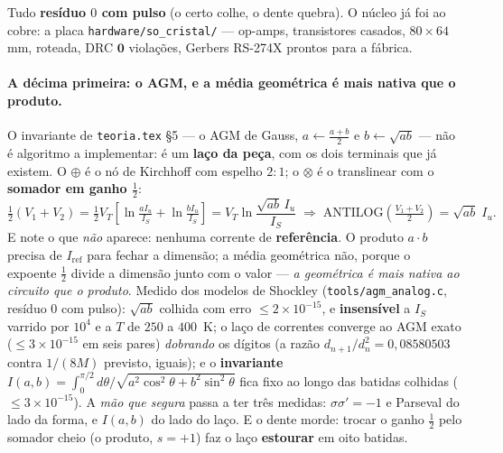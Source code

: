 \documentclass[11pt]{article}
\newcommand{\code}[1]{\texttt{\small #1}}
\theoremstyle{plain}
\theoremstyle{remark}
\begin{document}
\noindent Tudo \textbf{resíduo $0$ com pulso} (o certo colhe, o dente quebra). O núcleo já foi ao
cobre: a placa \code{hardware/so\_cristal/} --- op-amps, transistores casados, $80\times64$ mm, roteada,
DRC $\mathbf 0$ violações, Gerbers RS-274X prontos para a fábrica.

\paragraph{A décima primeira: o AGM, e a média geométrica é mais nativa que o produto.} O invariante
de \code{teoria.tex} §5 --- o AGM de Gauss, $a\leftarrow\frac{a+b}2$ e $b\leftarrow\sqrt{ab}$ --- não é
algoritmo a implementar: é um \textbf{laço da peça}, com os dois terminais que já existem. O $\oplus$ é
o nó de Kirchhoff com espelho $2{:}1$; o $\otimes$ é o translinear com o \textbf{somador em ganho
$\tfrac12$}:
\[
 \tfrac12(V_1+V_2)=\tfrac12 V_T\!\left[\ln\tfrac{a I_u}{I_S}+\ln\tfrac{b I_u}{I_S}\right]
 = V_T\ln\frac{\sqrt{ab}\,I_u}{I_S}
 \;\Longrightarrow\;
 \mathrm{ANTILOG}\!\left(\tfrac{V_1+V_2}{2}\right)=\sqrt{ab}\;I_u.
\]
E note o que \emph{não} aparece: nenhuma corrente de \textbf{referência}. O produto $a\cdot b$ precisa
de $I_{\text{ref}}$ para fechar a dimensão; a média geométrica não, porque o expoente $\tfrac12$ divide
a dimensão junto com o valor --- \emph{a geométrica é mais nativa ao circuito que o produto}. Medido
dos modelos de Shockley (\code{tools/agm\_analog.c}, resíduo $0$ com pulso): $\sqrt{ab}$ colhida com
erro $\le2\times10^{-15}$, e \textbf{insensível} a $I_S$ varrido por $10^4$ e a $T$ de $250$ a
$400$~K; o laço de correntes converge ao AGM exato ($\le3\times10^{-15}$ em seis pares) \emph{dobrando}
os dígitos (a razão $d_{n+1}/d_n^2=0{,}08580503$ contra $1/(8M)$ previsto, iguais); e o
\textbf{invariante} $I(a,b)=\int_0^{\pi/2}d\theta/\sqrt{a^2\cos^2\theta+b^2\sin^2\theta}$ fica fixo ao
longo das batidas colhidas ($\le3\times10^{-15}$). A \emph{mão que segura} passa a ter três medidas:
$\sigma\sigma'=-1$ e Parseval do lado da forma, e $I(a,b)$ do lado do laço. E o dente morde: trocar o
ganho $\tfrac12$ pelo somador cheio (o produto, $s=+1$) faz o laço \textbf{estourar} em oito batidas.
\end{document}
